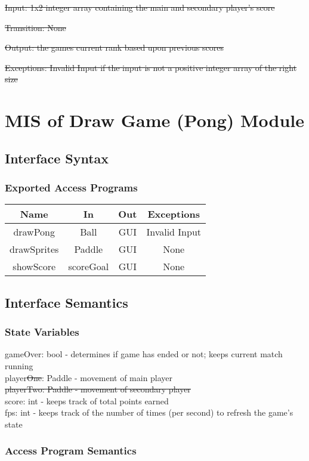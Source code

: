 \documentclass[12pt, titlepage]{article}
\begin{document}
		\sout{Input: 1x2 integer array containing the main and secondary player's score}
		
    	\sout{Transition: None}
		
		\sout{Output: the games current rank based upon previous scores}
		
		\sout{Exceptions: Invalid Input if the input is not a positive integer array of the right size}

\section{MIS of Draw Game (Pong) Module}
		\subsection{Interface Syntax}
		\subsubsection{Exported Access Programs}
		\begin{tabular}[pos]{|c|c|c|c|}
			\hline
			\textbf{Name}& \textbf{In} & \textbf{Out} & \textbf{Exceptions} \\ \hline
			drawPong & Ball & GUI & Invalid Input \\ \hline
			drawSprites & Paddle & GUI & None \\ \hline
			showScore & scoreGoal & GUI & None \\ \hline
		\end{tabular}
		
		\subsection{Interface Semantics}
		\subsubsection{State Variables}
		gameOver: bool - determines if game has ended or not; keeps current match running \\
		player\sout{One}: Paddle - movement of main player \\
		\sout{playerTwo: Paddle - movement of secondary player} \\
		score: int - keeps track of total points earned \\
		fps: int - keeps track of the number of times (per second) to refresh the game's state
		
		\subsubsection{Access Program Semantics}
		
\end{document}
